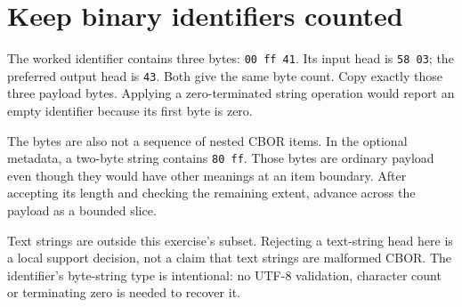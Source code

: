 \section{Keep binary identifiers counted}
The worked identifier contains three bytes: \texttt{00 ff 41}. Its input head is
\texttt{58 03}; the preferred output head is \texttt{43}. Both give the same byte count.
Copy exactly those three payload bytes. Applying a zero-terminated string operation
would report an empty identifier because its first byte is zero.

The bytes are also not a sequence of nested CBOR items. In the optional metadata,
a two-byte string contains \texttt{80 ff}. Those bytes are ordinary payload even though
they would have other meanings at an item boundary. After accepting its length and
checking the remaining extent, advance across the payload as a bounded slice.

Text strings are outside this exercise's subset. Rejecting a text-string head here
is a local support decision, not a claim that text strings are malformed CBOR. The
identifier's byte-string type is intentional: no UTF-8 validation, character count or
terminating zero is needed to recover it.

